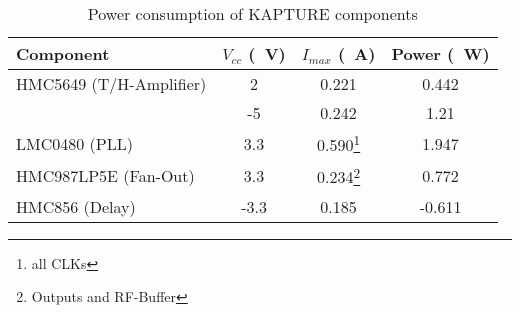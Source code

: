 \begin{table}[tbh!]
	\caption{Power consumption of KAPTURE components}
	\label{tab:kapturecomp}
	\begin{minipage}{\textwidth}
	\centering
	\begin{tabular}{lccc}
		\toprule
		\textbf{Component} & \textbf{$V_{cc}$ (\SI{}{\volt})} & \textbf{$I_{max}$ (\SI{}{\ampere})} & \textbf{Power (\SI{}{\watt})}\\
			\midrule
		HMC5649 (T/H-Amplifier) 	& 2 & 0.221 & 0.442\\
								& -5 & 0.242 & 1.21\\
		LMC0480 (PLL) 			& 3.3 & 0.590\footnote{all CLKs} & 1.947\\
		HMC987LP5E (Fan-Out) 	& 3.3 & 0.234\footnote{ Outputs and RF-Buffer} & 0.772\\
		HMC856 (Delay) & -3.3 & 0.185 & -0.611 \\
		\bottomrule
		\end{tabular}
	\end{minipage}
\end{table}
